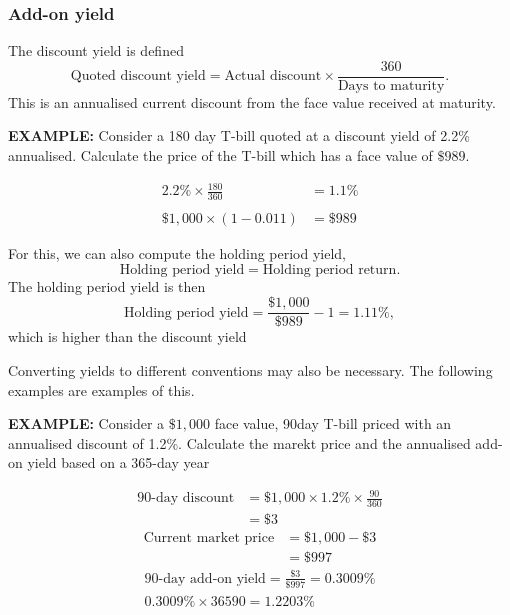 \documentclass[../notes_compiled.tex]{subfiles}
\begin{document}
\subsubsection{Add-on yield}
\begin{itemize}
\item The discount yield is defined
\begin{equation}
\text{Quoted discount yield}=\text{Actual discount}\times\frac{360}{\text{Days to maturity}}.
\end{equation}
This is an annualised current discount from the face value received at maturity.

{\color{RedViolet}
\item[] \textbf{EXAMPLE:} Consider a 180 day T-bill quoted at a discount yield of 2.2\% annualised. Calculate the price of the T-bill which has a face value of $\$989$.
}
{\color{RoyalBlue}

\begin{align*}
2.2\% \times \frac{180}{360} &=1.1\% \\ \\
\$1,000 \times (1-0.011) &= \$989
\end{align*}

}

For this, we can also compute the holding period yield,
\begin{equation}
\text{Holding period yield} = \text{Holding period return}.
\end{equation}
{\color{RoyalBlue}
The holding period yield is then
\begin{equation*}
\text{Holding period yield} = \frac{\$1,000}{\$989}-1 = 1.11\%,
\end{equation*}
which is higher than the discount yield
}

\item Converting yields to different conventions may also be necessary. The following examples are examples of this.

{\color{RedViolet}
\item[] \textbf{EXAMPLE:} Consider a $\$1,000$ face value, 90day T-bill priced with an annualised discount of 1.2\%. Calculate the marekt price and the annualised add-on yield based on a 365-day year
}
{\color{RoyalBlue}
\begin{align*}
\text{90-day discount}&=\$1,000 \times 1.2\% \times \frac{90}{360} \\
&=\$3
\end{align*}
\begin{align*}
\text{Current market price} &= \$1,000-\$3 \\
&=\$997
\end{align*}
\begin{gather*}
\text{90-day add-on yield}=\frac{\$3}{\$997} = 0.3009\% \\
0.3009\%\times{365}{90}=1.2203\%
\end{gather*}
}


\end{itemize}
\end{document}
